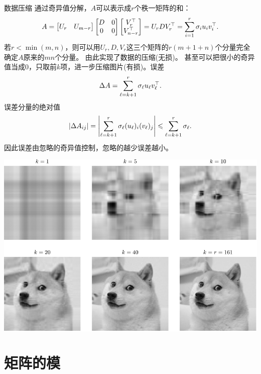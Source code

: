 \begin{example}{数据压缩}{}
	通过奇异值分解，$A$可以表示成$r$个秩一矩阵的和：
	\[
		A=\begin{bmatrix}
			U_r&U_{m-r}
		\end{bmatrix}\begin{bmatrix}
			D&0\\0&0
		\end{bmatrix}\begin{bmatrix}
			V_r^\top\\V_{n-r}^\top
		\end{bmatrix}=U_rDV_r^\top=\sum_{i=1}^r\sigma_iu_iv_i^\top.
	\]
	若$r<\min(m,n)$，则可以用$U_r,D,V_r$这三个矩阵的$r(m+1+n)$个分量完全确定$A$原来的$mn$个分量。
	由此实现了数据的压缩(无损)。
	\tcblower
	甚至可以把很小的奇异值当成0，只取前$k$项，进一步压缩图片(有损)。误差
	\[
		\Delta A=\sum_{\ell=k+1}^r\sigma_\ell u_\ell v_\ell^\top.
	\]
	误差分量的绝对值
	\[
		|\Delta A_{ij}|=\left\lvert\sum_{\ell=k+1}^r\sigma_\ell (u_\ell)_i (v_\ell)_j\right\rvert\leqslant\sum_{\ell=k+1}^r\sigma_\ell.
	\]
	因此误差由忽略的奇异值控制，忽略的越少误差越小。

	\begin{center}
        \includegraphics[width=0.8\linewidth]{graphs/svcompress.pdf}
    \end{center}
\end{example}

\section{矩阵的模}

